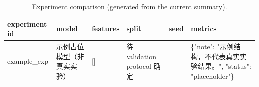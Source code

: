 \begin{table}[htbp]
\centering
\small
\begin{tabular}{llllll}
\toprule
experiment id & model & features & split & seed & metrics \\
\midrule
example\_exp & 示例占位模型（非真实实验） & [] & 待 validation protocol 确定 &  & \{"note": "示例结构，不代表真实实验结果。", "status": "placeholder"\} \\
\bottomrule
\end{tabular}
\caption{Experiment comparison (generated from the current summary).}
\label{tab:model-comparison}
\end{table}
